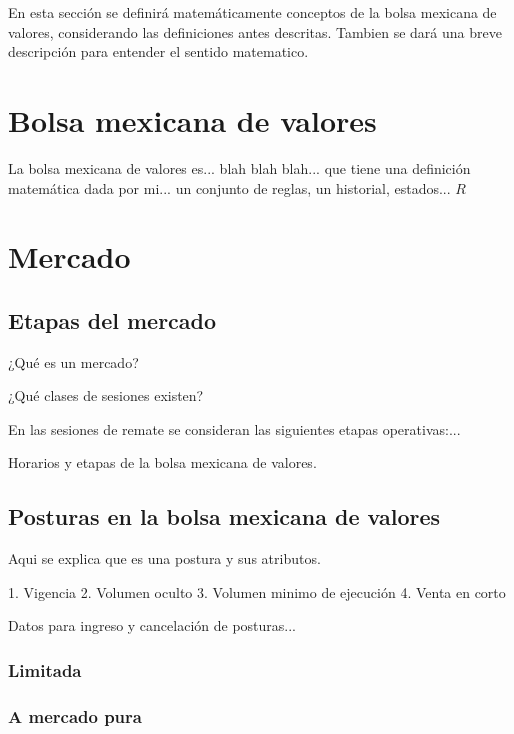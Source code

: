     En esta sección se definirá matemáticamente conceptos de la bolsa mexicana de valores, considerando las definiciones antes descritas. Tambien se dará una breve descripción para entender el sentido matematico.
    
    \section{ Bolsa mexicana de valores }
        
        La bolsa mexicana de valores es... blah blah blah... que tiene una definición matemática dada por mi... un conjunto de reglas, un historial, estados... $R$
       
    \section{ Mercado }
    
        \subsection{ Etapas del mercado }
        
        ¿Qué es un mercado?
        
        ¿Qué clases de sesiones existen?
        
        En las sesiones de remate se consideran las siguientes etapas operativas:...
       
        Horarios y etapas de la bolsa mexicana de valores.         
                
        \subsection{ Posturas en la bolsa mexicana de valores }   
        
            Aqui se explica que es una postura y sus atributos. 
            
                1. Vigencia 
                2. Volumen oculto
                3. Volumen minimo de ejecución
                4. Venta en corto
                
            Datos para ingreso y cancelación de posturas...
                
            \subsubsection{ Limitada }
            
            \subsubsection{ A mercado pura }
            
